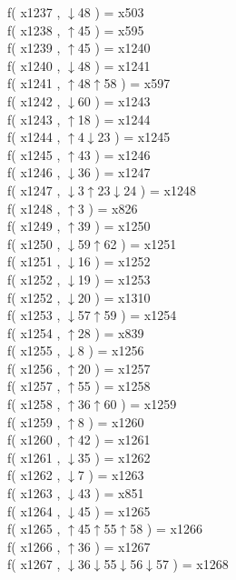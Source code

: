 f( x1237 , $\downarrow$48 ) = x503 \\
f( x1238 , $\uparrow$45 ) = x595 \\
f( x1239 , $\uparrow$45 ) = x1240 \\
f( x1240 , $\downarrow$48 ) = x1241 \\
f( x1241 , $\uparrow$48$\uparrow$58 ) = x597 \\
f( x1242 , $\downarrow$60 ) = x1243 \\
f( x1243 , $\uparrow$18 ) = x1244 \\
f( x1244 , $\uparrow$4$\downarrow$23 ) = x1245 \\
f( x1245 , $\uparrow$43 ) = x1246 \\
f( x1246 , $\downarrow$36 ) = x1247 \\
f( x1247 , $\downarrow$3$\uparrow$23$\downarrow$24 ) = x1248 \\
f( x1248 , $\uparrow$3 ) = x826 \\
f( x1249 , $\uparrow$39 ) = x1250 \\
f( x1250 , $\downarrow$59$\uparrow$62 ) = x1251 \\
f( x1251 , $\downarrow$16 ) = x1252 \\
f( x1252 , $\downarrow$19 ) = x1253 \\
f( x1252 , $\downarrow$20 ) = x1310 \\
f( x1253 , $\downarrow$57$\uparrow$59 ) = x1254 \\
f( x1254 , $\uparrow$28 ) = x839 \\
f( x1255 , $\downarrow$8 ) = x1256 \\
f( x1256 , $\uparrow$20 ) = x1257 \\
f( x1257 , $\uparrow$55 ) = x1258 \\
f( x1258 , $\uparrow$36$\uparrow$60 ) = x1259 \\
f( x1259 , $\uparrow$8 ) = x1260 \\
f( x1260 , $\uparrow$42 ) = x1261 \\
f( x1261 , $\downarrow$35 ) = x1262 \\
f( x1262 , $\downarrow$7 ) = x1263 \\
f( x1263 , $\downarrow$43 ) = x851 \\
f( x1264 , $\downarrow$45 ) = x1265 \\
f( x1265 , $\uparrow$45$\uparrow$55$\uparrow$58 ) = x1266 \\
f( x1266 , $\uparrow$36 ) = x1267 \\
f( x1267 , $\downarrow$36$\downarrow$55$\downarrow$56$\downarrow$57 ) = x1268 \\
